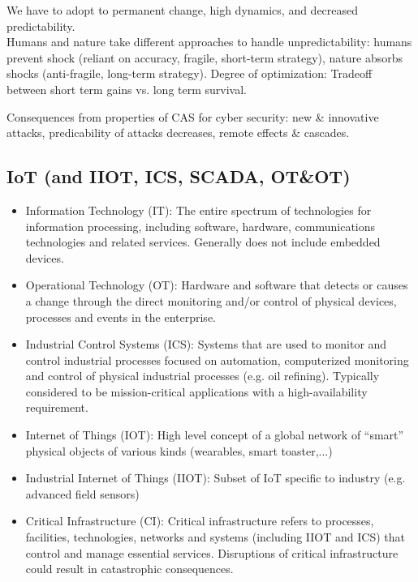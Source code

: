 \documentclass[11pt,oneside,a4paper]{article}
\begin{document}
We have to adopt to permanent change, high dynamics, and decreased predictability.\\

Humans and nature take different approaches to handle unpredictability: humans prevent shock (reliant on accuracy, fragile, short-term strategy), nature absorbs shocks (anti-fragile, long-term strategy). Degree of optimization: Tradeoff between short term gains vs. long term survival.

Consequences from properties of CAS for cyber security: new \& innovative attacks, predicability of attacks decreases, remote effects \& cascades.

\subsection{IoT (and IIOT, ICS, SCADA, OT\&OT)}

\vspace{-\topsep}
\begin{itemize}
	\setlength{\itemsep}{0pt}
	\setlength{\parskip}{0pt}
	\item Information Technology (IT): The entire spectrum of technologies for information processing, including software, hardware, communications technologies and related services. Generally does not include embedded devices.
	\item Operational Technology (OT): Hardware and software that detects or causes a change through the direct monitoring and/or control of physical devices, processes and events in the
	enterprise.
	\item Industrial Control Systems (ICS): Systems that are used to monitor and control industrial processes focused on automation, computerized monitoring and control of physical industrial processes (e.g. oil refining). Typically considered to be mission-critical applications with a high-availability requirement.
	\item Internet of Things (IOT): High level concept of a global network of “smart” physical objects of various kinds (wearables, smart toaster,...)\
	\item Industrial Internet of Things (IIOT): Subset of IoT specific to industry (e.g. advanced field sensors)
	\item Critical Infrastructure (CI): Critical infrastructure refers to processes, facilities, technologies, networks and systems (including IIOT and ICS) that control and manage essential services. Disruptions of critical infrastructure could result in catastrophic consequences.
\end{itemize}
\vspace{-\topsep}
\end{document}
